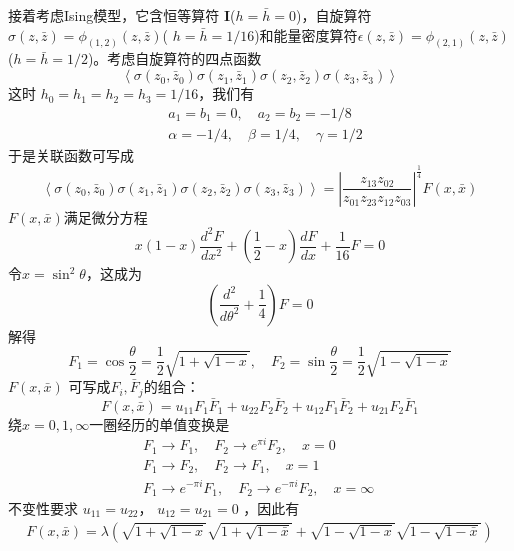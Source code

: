接着考虑Ising模型，它含恒等算符 $\boldsymbol{I}$($h=\bar{h}=0$)，自旋算符$ \sigma(z, \bar{z})=\phi_{(1,2)}(z, \bar{z})$( $h=\bar{h}=1/16$)和能量密度算符$\epsilon(z, \bar{z})=\phi_{(2,1)}(z, \bar{z})$($h=\bar{h}=1/2 $)。考虑自旋算符的四点函数
$$
\left\langle\sigma\left(z_{0}, \bar{z}_{0}\right) \sigma\left(z_{1}, \bar{z}_{1}\right) \sigma\left(z_{2}, \bar{z}_{2}\right) \sigma\left(z_{3}, \bar{z}_{3}\right)\right\rangle
$$
这时 $h_{0}=h_{1}=h_{2}=h_{3} =1/16 $，我们有
\begin{equation}
	\begin{aligned} &a_{1}=b_{1}=0, \quad a_{2}=b_{2}=-1/8 \\ &\alpha=-1/4,\quad \beta=1/4,\quad \gamma=1/2
	 \end{aligned}
\end{equation}
于是关联函数可写成
\begin{equation}
	\left\langle\sigma\left(z_{0}, \bar{z}_{0}\right) \sigma\left(z_{1}, \bar{z}_{1}\right) \sigma\left(z_{2}, \bar{z}_{2}\right) \sigma\left(z_{3}, \bar{z}_{3}\right)\right\rangle=\left|\frac{z_{13} z_{02}}{z_{01} z_{23} z_{12} z_{03}}\right|^{\frac{1}{4}} F(x, \bar{x})
\end{equation}
$F(x, \bar{x}) $满足微分方程
\begin{equation}
	x(1-x) \frac{d^{2} F}{d x^{2}}+\left(\frac{1}{2}-x\right) \frac{d F}{d x}+\frac{1}{16} F=0
\end{equation}
令$ x=\sin^2\theta $，这成为
$$
\left(\frac{d^{2}}{d \theta^{2}}+\frac{1}{4}\right) F=0
$$
解得
\begin{equation}
	F_{1}=\cos \frac{\theta}{2}=\frac{1}{2} \sqrt{1+\sqrt{1-x}}, \quad F_{2}=\sin \frac{\theta}{2}=\frac{1}{2} \sqrt{1-\sqrt{1-x}}
\end{equation}
$F(x, \bar{x})$ 可写成$ F_i,\bar{F}_j $的组合：
\begin{equation}
	F(x, \bar{x})=u_{11} F_{1} \bar{F}_{1}+u_{22} F_{2} \bar{F}_{2}+u_{12} F_{1} \bar{F}_{2}+u_{21} F_{2} \bar{F}_{1}
\end{equation} 
绕$ x=0,1,\infty $一圈经历的单值变换是
\begin{align} &F_{1} \rightarrow F_{1}, \quad F_{2} \rightarrow e^{\pi i} F_{2}, \quad x=0\quad \\ &F_{1} \rightarrow F_{2}, \quad F_{2} \rightarrow F_{1}, \quad x=1\quad\\ &F_{1} \rightarrow e^{-\pi i} F_{1}, \quad F_{2} \rightarrow e^{-\pi i} F_{2}, \quad x=\infty\quad  \end{align}
不变性要求 $u_{11}=u_{22} $， $u_{12}=u_{21}=0$ ，因此有
\begin{equation}
	\begin{aligned} F(x, \bar{x})=\lambda\left( \sqrt{1+\sqrt{1-x}} \sqrt{1+\sqrt{1-\bar{x}}}+\sqrt{1-\sqrt{1-x}} \sqrt{1-\sqrt{1-\bar{x}}}\right) \end{aligned}
\end{equation}


